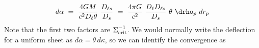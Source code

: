 \begin{equation}
  d\alpha \ =\ \frac{4GM}{c^2 D_\ell \theta}\ \frac{D_{\ell s}}{D_s}
  \ =\ \frac{4\pi G}{c^2}\ \frac{D_\ell D_{\ell s}}{D_s}\ \theta\ \drho_p\ dr_p
\end{equation}
Note that the first two factors are $\Sigma_{\rm crit}^{-1}$.  We would normally write the deflection for a uniform sheet as $d\alpha = \theta\,d\kappa$, so we can identify the convergence as
  